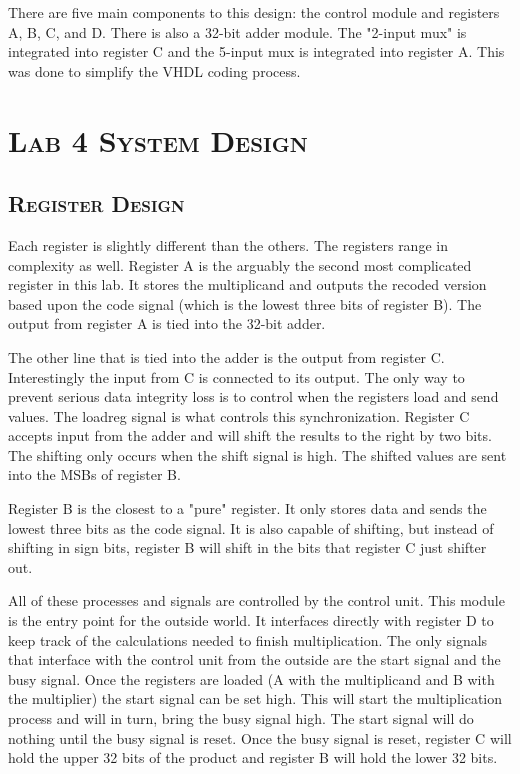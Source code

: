 \documentclass[11pt]{report}
\begin{document}
\begin{spacing}{1.5}
There are five main components to this design: the control module and registers A, B, C, and D.  There is also a 32-bit adder module.  The "2-input mux" is integrated into register C and the 5-input mux is integrated into register A.  This was done to simplify the VHDL coding process.

\section{\scshape Lab 4 System Design} %
\label{sec:fsm_design}

\subsection{\scshape Register Design}
\label{sub:design_piso}

Each register is slightly different than the others.  The registers range in complexity as well.  Register A is the arguably the second most complicated register in this lab.  It stores the multiplicand and outputs the recoded version based upon the code signal (which is the lowest three bits of register B).  The output from register A is tied into the 32-bit adder.

The other line that is tied into the adder is the output from register C.  Interestingly the input from C is connected to its output.  The only way to prevent serious data integrity loss is to control when the registers load and send values.  The loadreg signal is what controls this synchronization.  Register C accepts input from the adder and will shift the results to the right by two bits.  The shifting only occurs when the shift signal is high.  The shifted values are sent into the MSBs of register B.

Register B is the closest to a "pure" register.  It only stores data and sends the lowest three bits as the code signal.  It is also capable of shifting, but instead of shifting in sign bits, register B will shift in the bits that register C just shifter out.

All of these processes and signals are controlled by the control unit.  This module is the entry point for the outside world.  It interfaces directly with register D to keep track of the calculations needed to finish multiplication.  The only signals that interface with the control unit from the outside are the start signal and the busy signal.  Once the registers are loaded (A with the multiplicand and B with the multiplier) the start signal can be set high.  This will start the multiplication process and will in turn, bring the busy signal high.  The start signal will do nothing until the busy signal is reset.  Once the busy signal is reset, register C will hold the upper 32 bits of the product and register B will hold the lower 32 bits.
\clearpage


\end{spacing}
\end{document}
